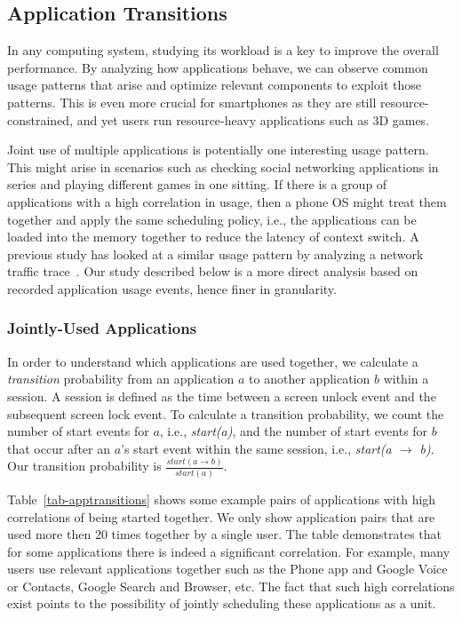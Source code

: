 \subsection{Application Transitions}
\label{subsec-apptransitions}



In any computing system, studying its workload is a key to improve the overall
performance. By analyzing how applications behave, we can observe common usage
patterns that arise and optimize relevant components to exploit those patterns.
This is even more crucial for smartphones as they are still
resource-constrained, and yet users run resource-heavy applications such as 3D
games.

Joint use of multiple applications is potentially one interesting usage pattern.
This might arise in scenarios such as checking social networking applications in
series and playing different games in one sitting. If there is a group of
applications with a high correlation in usage, then a phone OS might treat them
together and apply the same scheduling policy, i.e., the applications can be
loaded into the memory together to reduce the latency of context switch.
A previous study has looked at a similar usage pattern by analyzing a network
traffic trace~\cite{xu:imc:2011}. Our study described below is a more direct
analysis based on recorded application usage events, hence finer in granularity.

\subsubsection{Jointly-Used Applications}
In order to understand which applications are used together, we calculate a {\it
transition} probability from an application $a$ to another application $b$
within a session. A session is defined as the time between a screen unlock event
and the subsequent screen lock event. To calculate a transition probability, we
count the number of start events for $a$, i.e., {\it start(a)}, and the number
of start events for $b$ that occur after an $a$'s start event within the same
session, i.e., {\it start(a $\rightarrow$ b)}. Our transition probability is
$\frac{start(a \rightarrow b)}{start(a)}$.

Table~\ref{tab-apptransitions} shows some example pairs of applications with
high correlations of being started together. We only show application pairs that
are used more then 20 times together by a single user. The table demonstrates
that for some applications there is indeed a significant correlation.
For example, many users use relevant applications together such as the Phone app
and Google Voice or Contacts, Google Search and Browser, etc. The fact that such
high correlations exist points to the possibility of jointly scheduling these
applications as a unit.

